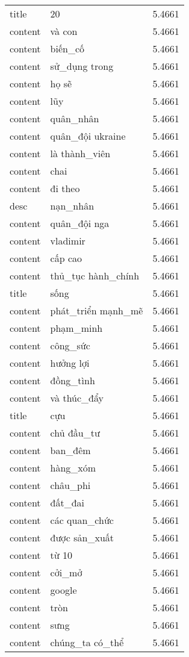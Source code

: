 \documentclass{article}
\begin{document}
\begin{tabular}{lll}
title & 20 & 5.4661\\
content & và con & 5.4661\\
content & biến\_cố & 5.4661\\
content & sử\_dụng trong & 5.4661\\
content & họ sẽ & 5.4661\\
content & lũy & 5.4661\\
content & quân\_nhân & 5.4661\\
content & quân\_đội ukraine & 5.4661\\
content & là thành\_viên & 5.4661\\
content & chai & 5.4661\\
content & đi theo & 5.4661\\
desc & nạn\_nhân & 5.4661\\
content & quân\_đội nga & 5.4661\\
content & vladimir & 5.4661\\
content & cấp cao & 5.4661\\
content & thủ\_tục hành\_chính & 5.4661\\
title & sống & 5.4661\\
content & phát\_triển mạnh\_mẽ & 5.4661\\
content & phạm\_minh & 5.4661\\
content & công\_sức & 5.4661\\
content & hưởng lợi & 5.4661\\
content & đồng\_tình & 5.4661\\
content & và thúc\_đẩy & 5.4661\\
title & cựu & 5.4661\\
content & chủ đầu\_tư & 5.4661\\
content & ban\_đêm & 5.4661\\
content & hàng\_xóm & 5.4661\\
content & châu\_phi & 5.4661\\
content & đất\_đai & 5.4661\\
content & các quan\_chức & 5.4661\\
content & được sản\_xuất & 5.4661\\
content & từ 10 & 5.4661\\
content & cởi\_mở & 5.4661\\
content & google & 5.4661\\
content & tròn & 5.4661\\
content & sưng & 5.4661\\
content & chúng\_ta có\_thể & 5.4661\\

\end{tabular}
\end{document}
